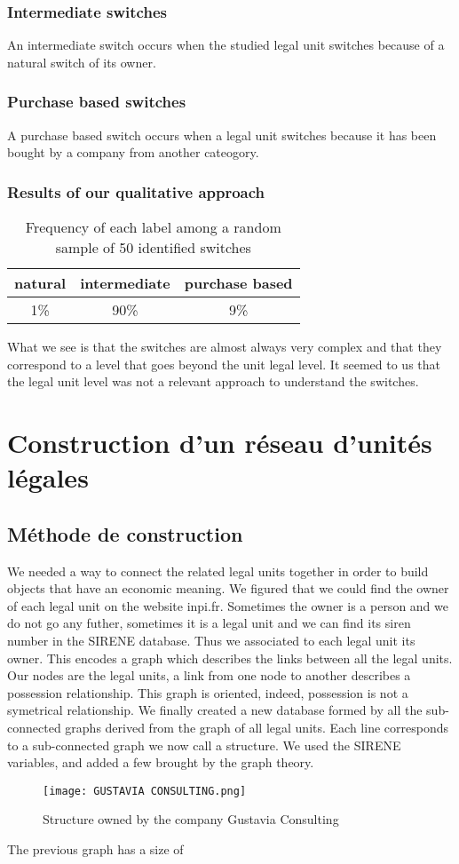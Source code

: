 \documentclass[AEJ]{AEA}
\begin{document}
\subsubsection{Intermediate switches}
An intermediate switch occurs when the studied legal unit switches because of a natural switch of its owner.
\subsubsection{Purchase based switches}
A purchase based switch occurs when a legal unit switches because it has been bought by a company from another cateogory.
\subsubsection{Results of our qualitative approach}
\begin{table}
    \begin{tabular}{c|c|c}
        \hline
        natural & intermediate & purchase based \\
        \hline
        1\% & 90\% & 9\% \\
        \hline
    \end{tabular}
    \caption{Frequency of each label among a random sample of 50 identified switches}
\end{table}
What we see is that the switches are almost always very complex and that they correspond to
a level that goes beyond the unit legal level. It seemed to us that the legal unit level
was not a relevant approach to understand the switches.
\section{Construction d'un réseau d'unités légales}
\subsection{Méthode de construction}
We needed a way to connect the related legal units together in order to
build objects that have an economic meaning. We figured that we could
find the owner of each legal unit on the website inpi.fr.
Sometimes the owner is a person and we do not go any futher, sometimes it is a legal unit
and we can find its siren number in the SIRENE database.
Thus we associated to each legal unit its owner.
This encodes a graph which describes the links between all the legal units.
Our nodes are the legal units, a link from one node to another describes a possession relationship.
This graph is oriented, indeed, possession is not a symetrical relationship.
We finally created a new database formed by all the sub-connected graphs derived from the graph of all legal units.
Each line corresponds to a sub-connected graph we now call a structure.
We used the SIRENE variables, and added a few brought by the graph theory.
\begin{figure}
    \texttt{[image: GUSTAVIA CONSULTING.png]}
    \caption{Structure owned by the company Gustavia Consulting}
\end{figure}
The previous graph has a size of 
\end{document}
